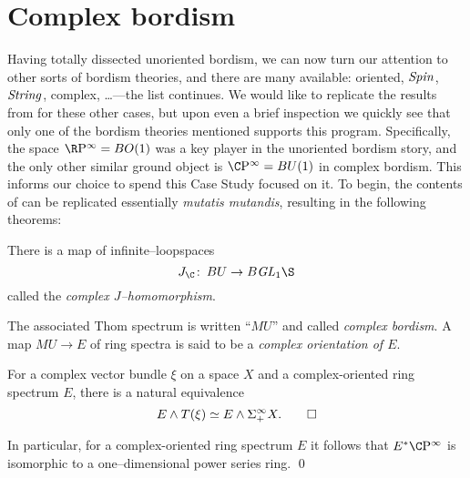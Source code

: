 
\chapter{Complex bordism}\label{ComplexBordismChapter}


Having totally dissected unoriented bordism, we can now turn our attention to other sorts of bordism theories, and there are many available: oriented, $\mathit{Spin}$, $\mathit{String}$, complex, \ldots---the list continues.  We would like to replicate the results from  for these other cases, but upon even a brief inspection we quickly see that only one of the bordism theories mentioned supports this program.  Specifically, the space $\RP^\infty = BO(1)$ was a key player in the unoriented bordism story, and the only other similar ground object is $\CP^\infty = BU(1)$ in complex bordism.  This informs our choice to spend this Case Study focused on it.  To begin, the contents of  can be replicated essentially \textit{mutatis mutandis}, resulting in the following theorems:

\begin{theorem}\label{ComplexJHomomorphism}
There is a map of infinite--loopspaces \[J_{\C}\co BU \to B \GL_1 \S\] called the \textit{complex $J$--homomorphism}.
\end{theorem}

\begin{definition}\label{DefnComplexOrientation}
The associated Thom spectrum is written ``$MU$'' and called \textit{complex bordism}.  A map $MU \to E$ of ring spectra is said to be a \textit{complex orientation of $E$}.
\end{definition}

\begin{theorem}\label{ThomIsomOverC}
For a complex vector bundle $\xi$ on a space $X$ and a complex-oriented ring spectrum $E$, there is a natural equivalence \[E \wedge T(\xi) \simeq E \wedge \Sigma^\infty_+ X. \qed\]
\end{theorem}

\begin{corollary}\label{CPinftyNiceCalculation}
In particular, for a complex-oriented ring spectrum $E$ it follows that $E^* \CP^\infty$ is isomorphic to a one--dimensional power series ring. \qed
{}
\end{corollary}

